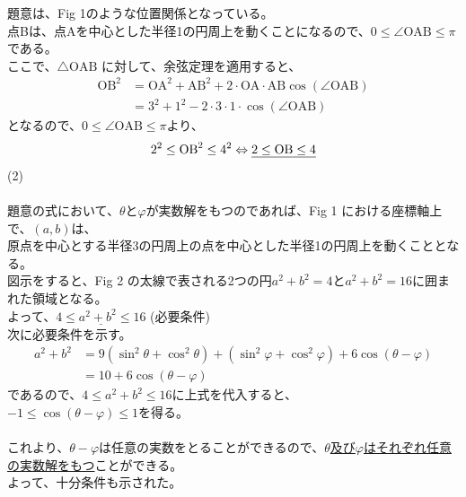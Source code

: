 \documentclass[a4j,10pt,oneside,openany]{jsbook}
\newcommand{\btu}{\bigtriangleup} %
\begin{document}
題意は、Fig 1のような位置関係となっている。\\
点Bは、点Aを中心とした半径1の円周上を動くことになるので、$0 \leq \angle \mathrm{OAB} \leq \pi$ である。\\
ここで、$\btu \mathrm{OAB}$ に対して、余弦定理を適用すると、\\
\begin{align*}
\mathrm{OB}^2 &= \mathrm{OA}^2 + \mathrm{AB}^2 + 2 \cdot \mathrm{OA} \cdot \mathrm{AB}\cos(\angle \mathrm{OAB}) \\
			&= 3^2 + 1^2 -2\cdot3 \cdot 1 \cdot \cos(\angle \mathrm{OAB})
\end{align*}		
となるので、$0 \leq \angle \mathrm{OAB} \leq \pi$より、\\
\begin{equation*}
2^2 \leq \mathrm{OB}^2 \leq 4^2 \\
\Leftrightarrow \underline{2 \leq \mathrm{OB} \leq 4}
\end{equation*}
{\Large (2)}
\\
\\
題意の式において、$\theta$と$\varphi$が実数解をもつのであれば、Fig 1 における座標軸上で、$(a,b)$は、\\
原点を中心とする半径3の円周上の点を中心とした半径1の円周上を動くこととなる。\\
図示をすると、Fig 2 の太線で表される2つの円$a^2+b^2=4$と$a^2+b^2=16$に囲まれた領域となる。\\
よって、$\underline{4 \leq a^2+b^2 \leq 16}$ \;\;\; (必要条件)\\
次に必要条件を示す。\\
\begin{align*}
a^2+b^2 	&= 9(\sin^2\theta + \cos^2\theta) + (\sin^2\varphi + \cos^2\varphi)+6\cos(\theta-\varphi)\\
		&= 10+6\cos(\theta-\varphi)
\end{align*}
であるので、$4 \leq a^2+b^2 \leq 16$に上式を代入すると、\\
$-1 \leq \cos(\theta-\varphi) \leq 1$を得る。\\
\\
これより、$\theta-\varphi$は任意の実数をとることができるので、\underline{$\theta$及び$\varphi$はそれぞれ任意の実数解をもつ}ことができる。\\
よって、十分条件も示された。
\end{document}
